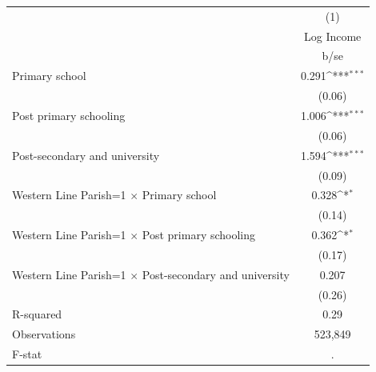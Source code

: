 {
\def\sym#1{\ifmmode^{#1}\else\(^{#1}\)\fi}
\begin{tabular}{l*{1}{c}}
\hline\hline
                    &\multicolumn{1}{c}{(1)}\\
                    &\multicolumn{1}{c}{Log Income}\\
                    &        b/se         \\
\hline
Primary school      &       0.291\sym{***}\\
                    &      (0.06)         \\
Post primary schooling&       1.006\sym{***}\\
                    &      (0.06)         \\
Post-secondary and university&       1.594\sym{***}\\
                    &      (0.09)         \\
Western Line Parish=1 $\times$ Primary school&       0.328\sym{*}  \\
                    &      (0.14)         \\
Western Line Parish=1 $\times$ Post primary schooling&       0.362\sym{*}  \\
                    &      (0.17)         \\
Western Line Parish=1 $\times$ Post-secondary and university&       0.207         \\
                    &      (0.26)         \\
\hline
R-squared           &        0.29         \\
Observations        &     523,849         \\
F-stat              &           .         \\
\hline\hline
\end{tabular}
}
